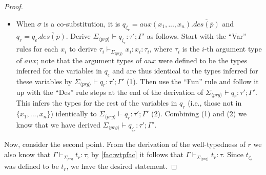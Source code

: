 \begin{lemma}
\begin{proof}
\begin{itemize}
\item When $\sigma$ is a co-substitution, it is $q_{\zeta_r} = aux(x_1, ..., x_n).\overline{des(\overline{p})}$ and $q_r = q_\epsilon.\overline{des(\overline{p})}$. Derive $\Sigma_{\langle prg \rangle} \vdash q_{\zeta_r} : \tau'; \Gamma'$ as follows. Start with the ``Var'' rules for each $x_i$ to derive $\tau_i \vdash_{\Sigma_{\langle prg \rangle}} x_i : x_i:\tau_i$, where $\tau_i$ is the $i$-th argument type of $aux$; note that the argument types of $aux$ were defined to be the types inferred for the variables in $q_\epsilon$ and are thus identical to the types inferred for these variables by $\Sigma_{\langle prg \rangle} \vdash q_r : \tau'; \Gamma'$ (1). Then use the ``Fun'' rule and follow it up with the ``Des'' rule steps at the end of the derivation of $\Sigma_{\langle prg \rangle} \vdash q_r : \tau'; \Gamma'$. This infers the types for the rest of the variables in $q_r$ (i.e., those not in $\{x_1, ..., x_n\}$) identically to $\Sigma_{\langle prg \rangle} \vdash q_r : \tau'; \Gamma'$ (2). Combining (1) and (2) we know that we have derived $\Sigma_{\langle prg \rangle} \vdash q_{\zeta_r} : \tau'; \Gamma'$.
\end{itemize}

Now, consider the second point. From the derivation of the well-typedness of $r$ we also know that $\Gamma \vdash_{\Sigma_{prg}} t_r : \tau$; by \autoref{fac:wtpfac} it follows that $\Gamma \vdash_{\Sigma_{\langle prg \rangle}} t_r : \tau$. Since $t_{\zeta_r}$ was defined to be $t_r$, we have the desired statement.
\end{proof}
\end{lemma}
